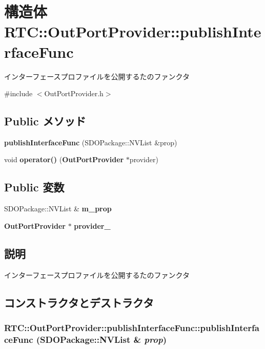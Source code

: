\section{構造体 RTC::OutPortProvider::publishInterfaceFunc}
\label{structRTC_1_1OutPortProvider_1_1publishInterfaceFunc}


インターフェースプロファイルを公開するたのファンクタ  




{\ttfamily \#include $<$OutPortProvider.h$>$}

\subsection*{Public メソッド}
\begin{DoxyCompactItemize}
\item 
{\bf publishInterfaceFunc} (SDOPackage::NVList \&prop)
\item 
void {\bf operator()} ({\bf OutPortProvider} $\ast$provider)
\end{DoxyCompactItemize}
\subsection*{Public 変数}
\begin{DoxyCompactItemize}
\item 
SDOPackage::NVList \& {\bf m\_\-prop}
\item 
{\bf OutPortProvider} $\ast$ {\bf provider\_\-}
\end{DoxyCompactItemize}


\subsection{説明}
インターフェースプロファイルを公開するたのファンクタ 

\subsection{コンストラクタとデストラクタ}
\subsubsection[{publishInterfaceFunc}]{\setlength{\rightskip}{0pt plus 5cm}RTC::OutPortProvider::publishInterfaceFunc::publishInterfaceFunc (SDOPackage::NVList \& {\em prop})\hspace{0.3cm}{\ttfamily  [inline]}}\label{structRTC_1_1OutPortProvider_1_1publishInterfaceFunc_ac1b26c6a01459c3be80e403c93857f92}


